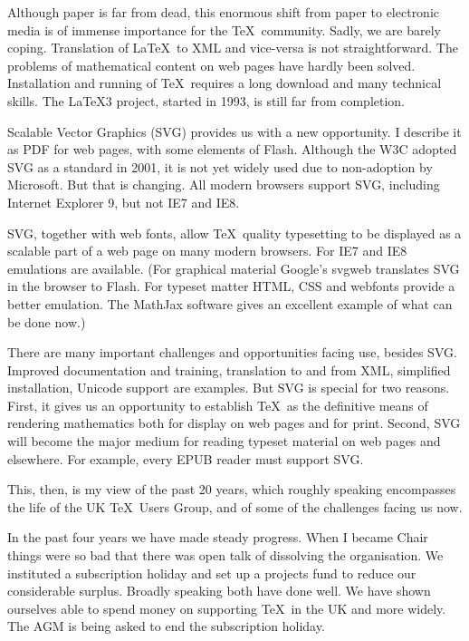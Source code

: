 \documentclass[11pt,a4paper]{article}
\begin{document}
Although paper is far from dead, this enormous shift from paper to
electronic media is of immense importance for the \TeX\ community.
Sadly, we are barely coping.  Translation of \LaTeX\ to XML and
vice-versa is not straightforward.  The problems of mathematical
content on web pages have hardly been solved.  Installation and
running of \TeX\ requires a long download and many technical skills.
The \LaTeX3 project, started in 1993, is still far from completion.

Scalable Vector Graphics (SVG) provides us with a new opportunity.  I
describe it as PDF for web pages, with some elements of Flash.
Although the W3C adopted SVG as a standard in 2001, it is not yet
widely used due to non-adoption by Microsoft.  But that is changing.
All modern browsers support SVG, including Internet Explorer 9, but
not IE7 and IE8.

SVG, together with web fonts, allow \TeX\ quality typesetting to be
displayed as a scalable part of a web page on many modern
browsers. For IE7 and IE8 emulations are available.  (For graphical
material Google's svgweb translates SVG in the browser to Flash.  For
typeset matter HTML, CSS and webfonts provide a better emulation.  The
MathJax software gives an excellent example of what can be done now.)

There are many important challenges and opportunities facing use,
besides SVG.  Improved documentation and training, translation to and
from XML, simplified installation, Unicode support are examples.  But
SVG is special for two reasons.  First, it gives us an opportunity
to establish \TeX\ as the definitive means of rendering mathematics
both for display on web pages and for print.  Second, SVG will become
the major medium for reading typeset material on web pages and
elsewhere.  For example, every EPUB reader must support SVG.

This, then, is my view of the past 20 years, which roughly speaking
encompasses the life of the UK \TeX\ Users Group, and of some of the
challenges facing us now.

In the past four years we have made steady progress.  When I became
Chair things were so bad that there was open talk of dissolving the
organisation.  We instituted a subscription holiday and set up a
projects fund to reduce our considerable surplus.  Broadly speaking
both have done well.  We have shown ourselves able to spend money on
supporting \TeX\ in the UK and more widely.  The AGM is being asked to
end the subscription holiday.
\end{document}
